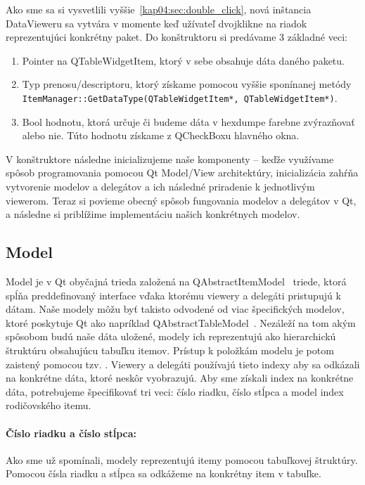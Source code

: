 Ako sme sa si vysvetlili vyššie~\ref{kap04:sec:double_click}, nová inštancia DataVieweru sa vytvára v momente keď užívateľ dvojklikne na riadok reprezentujúci konkrétny paket. Do konštruktoru si predávame 3 základné veci:
\begin{enumerate}
\item Pointer na QTableWidgetItem, ktorý v sebe obsahuje dáta daného paketu.

\item Typ prenosu/descriptoru, ktorý získame pomocou vyššie sponínanej metódy \texttt{ItemManager::GetDataType(QTableWidgetItem*, \newline QTableWidgetItem*)}.

\item Bool hodnotu, ktorá určuje či budeme dáta v hexdumpe farebne zvýrazňovať alebo nie. Túto hodnotu získame z QCheckBoxu hlavného okna.
\end{enumerate}

V konštruktore následne inicializujeme naše komponenty -- keďže využívame spôsob programovania pomocou Qt Model/View architektúry, inicializácia zahŕňa vytvorenie modelov a delegátov a ich následné priradenie k jednotlivým viewerom. Teraz si povieme obecný spôsob fungovania modelov a delegátov v Qt, a následne si priblížime implementáciu našich konkrétnych modelov.


\subsection{Model}
Model je v Qt obyčajná trieda založená na QAbstractItemModel~\cite{qabstractitemmodel} triede, ktorá spĺňa preddefinovaný interface vďaka ktorému viewery a delegáti pristupujú k dátam. Naše modely môžu byť takisto odvodené od viac špecifických modelov, ktoré poskytuje Qt ako napríklad QAbstractTableModel~\cite{qabstracttablemodel}. Nezáleží na tom akým spôsobom budú naše dáta uložené, modely ich reprezentujú ako hierarchickú štruktúru obsahujúcu tabuľku itemov. Prístup k položkám modelu je potom zaistený pomocou tzv. . Viewery a delegáti používajú tieto indexy aby sa odkázali na konkrétne dáta, ktoré neskôr vyobrazujú. Aby sme získali index na konkrétne dáta, potrebujeme špecifikovať tri veci: číslo riadku, číslo stĺpca a model index rodičovského itemu.
\paragraph{Číslo riadku a číslo stĺpca:} Ako sme už spomínali, modely reprezentujú itemy pomocou tabuľkovej štruktúry. Pomocou čísla riadku a stĺpca sa odkážeme na konkrétny item v tabuľke.
